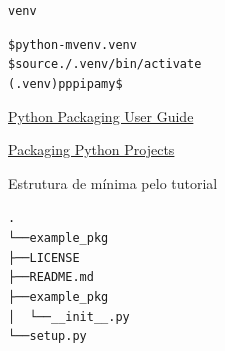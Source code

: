 \documentclass[11pt]{beamer}
\begin{document}
\begin{frame}[fragile]{\texttt{venv}}
\begin{alltt}
\$ python -m venv .venv
\$ source ./.venv/bin/activate
(.venv) pppipam y\$
\end{alltt}
\end{frame}

\begin{frame}[fragile]{\href{https://packaging.python.org/}{Python Packaging User Guide}}
  \hspace*{-.5cm}
\end{frame}

\begin{frame}[fragile]{\href{https://packaging.python.org/tutorials/packaging-projects/}{Packaging Python Projects}}
  \hspace*{-.5cm}
\end{frame}

\begin{frame}[fragile]{Estrutura de mínima pelo tutorial}
\begin{alltt}
.
└── example_pkg
    ├── LICENSE
    ├── README.md
    ├── example_pkg
    │   └── __init__.py
    └── setup.py
\end{alltt}
\end{frame}
\end{document}
